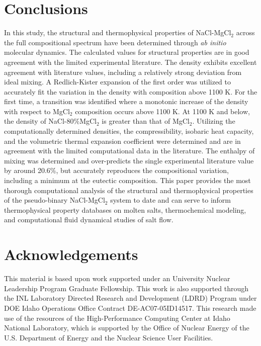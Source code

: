 \documentclass[review]{elsarticle}
\begin{document}
\section{Conclusions}
In this study, the structural and thermophysical properties of NaCl-MgCl$_2$ across the full compositional spectrum have been determined through \textit{ab initio} molecular dynamics. The calculated values for structural properties are in good agreement with the limited experimental literature. The density exhibits excellent agreement with literature values, including a relatively strong deviation from ideal mixing. A Redlich-Kister expansion of the first order was utilized to accurately fit the variation in the density with composition above 1100 K. For the first time, a transition was identified where a monotonic increase of the density with respect to MgCl$_2$ composition occurs above 1100 K. At 1100 K and below, the density of NaCl-80\%MgCl$_2$ is greater than that of MgCl$_2$. Utilizing the computationally determined densities, the compressibility, isobaric heat capacity, and the volumetric thermal expansion coefficient were determined and are in agreement with the limited computational data in the literature. The enthalpy of mixing was determined and over-predicts the single experimental literature value by around 20.6\%, but accurately reproduces the compositional variation, including a minimum at the eutectic composition. This paper provides the most thorough computational analysis of the structural and thermophysical properties of the pseudo-binary NaCl-MgCl$_2$ system to date and can serve to inform thermophysical property databases on molten salts, thermochemical modeling, and computational fluid dynamical studies of salt flow. 


\section{Acknowledgements}

This material is based upon work supported under an University Nuclear Leadership Program Graduate Fellowship. This work is also supported through the INL Laboratory Directed Research and Development (LDRD) Program under DOE Idaho Operations Office Contract DE-AC07-05ID14517. This research made use of the resources of the High-Performance Computing Center at Idaho National Laboratory, which is supported by the Office of Nuclear Energy of the U.S. Department of Energy and the Nuclear Science User Facilities.  


\end{document}
